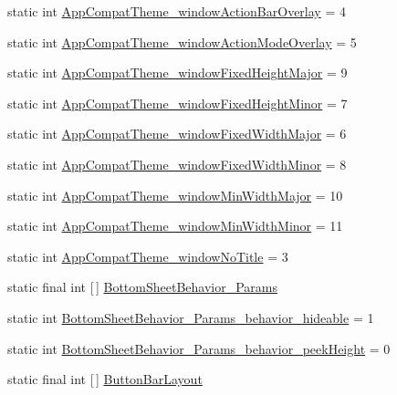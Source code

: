 \begin{DoxyCompactItemize}
static int \hyperlink{classandroid_1_1support_1_1v4_1_1R_1_1styleable_a35dd6a281168ca4263f3a47afa038b5a}{App\+Compat\+Theme\+\_\+window\+Action\+Bar\+Overlay} = 4
\item 
static int \hyperlink{classandroid_1_1support_1_1v4_1_1R_1_1styleable_a90589f30809f60bc8783dde73bb5e9f1}{App\+Compat\+Theme\+\_\+window\+Action\+Mode\+Overlay} = 5
\item 
static int \hyperlink{classandroid_1_1support_1_1v4_1_1R_1_1styleable_aaa685f805f4181374a8047b1ce8935b5}{App\+Compat\+Theme\+\_\+window\+Fixed\+Height\+Major} = 9
\item 
static int \hyperlink{classandroid_1_1support_1_1v4_1_1R_1_1styleable_a8406ab28fcb798abe69bcc846a2e8a7d}{App\+Compat\+Theme\+\_\+window\+Fixed\+Height\+Minor} = 7
\item 
static int \hyperlink{classandroid_1_1support_1_1v4_1_1R_1_1styleable_aeb98c393e76d842baf26189afd20c945}{App\+Compat\+Theme\+\_\+window\+Fixed\+Width\+Major} = 6
\item 
static int \hyperlink{classandroid_1_1support_1_1v4_1_1R_1_1styleable_af5b499ea473560087fcc1a5241132837}{App\+Compat\+Theme\+\_\+window\+Fixed\+Width\+Minor} = 8
\item 
static int \hyperlink{classandroid_1_1support_1_1v4_1_1R_1_1styleable_a5645adca1e8252ffeb1dc1c1480693b1}{App\+Compat\+Theme\+\_\+window\+Min\+Width\+Major} = 10
\item 
static int \hyperlink{classandroid_1_1support_1_1v4_1_1R_1_1styleable_a49209af19fab1feaef6b49e695bf15d0}{App\+Compat\+Theme\+\_\+window\+Min\+Width\+Minor} = 11
\item 
static int \hyperlink{classandroid_1_1support_1_1v4_1_1R_1_1styleable_a2434c4c955064f1b931a1059e587e1bb}{App\+Compat\+Theme\+\_\+window\+No\+Title} = 3
\item 
static final int \mbox{[}$\,$\mbox{]} \hyperlink{classandroid_1_1support_1_1v4_1_1R_1_1styleable_aeef0bb6121e7d6065d53100656871173}{Bottom\+Sheet\+Behavior\+\_\+\+Params}
\item 
static int \hyperlink{classandroid_1_1support_1_1v4_1_1R_1_1styleable_aa0e0b1fe9eb8320ac0c20a9fdd74f3f9}{Bottom\+Sheet\+Behavior\+\_\+\+Params\+\_\+behavior\+\_\+hideable} = 1
\item 
static int \hyperlink{classandroid_1_1support_1_1v4_1_1R_1_1styleable_a263c5bb11a9f89389416857ef1b21c5d}{Bottom\+Sheet\+Behavior\+\_\+\+Params\+\_\+behavior\+\_\+peek\+Height} = 0
\item 
static final int \mbox{[}$\,$\mbox{]} \hyperlink{classandroid_1_1support_1_1v4_1_1R_1_1styleable_ae83cd99b3980a7d0569414b072a8bd02}{Button\+Bar\+Layout}

\end{DoxyCompactItemize}
